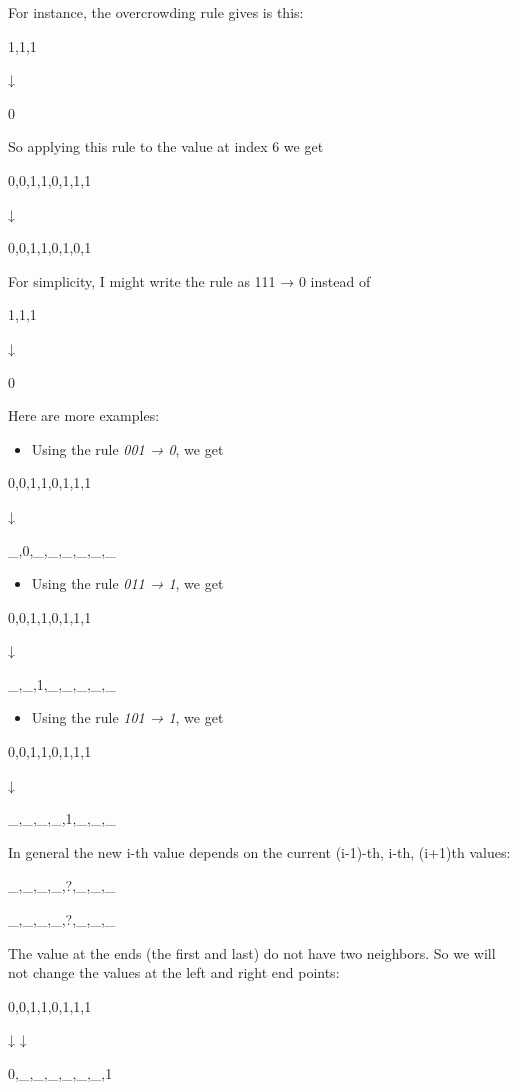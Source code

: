 \documentclass[
]{article}
\providecommand{\tightlist}{%
  \setlength{\itemsep}{0pt}\setlength{\parskip}{0pt}}
\begin{document}
For instance, the overcrowding rule gives is this:

1,1,1

↓

0

So applying this rule to the value at index 6 we get

0,0,1,1,0,1,1,1

↓

0,0,1,1,0,1,0,1

For simplicity, I might write the rule as 111 → 0 instead of

1,1,1

↓

0

Here are more examples:

\begin{itemize}
\tightlist
\item
  Using the rule \emph{001 → 0}, we get
\end{itemize}

0,0,1,1,0,1,1,1

↓

\_,0,\_,\_,\_,\_,\_,\_

\begin{itemize}
\tightlist
\item
  Using the rule \emph{011 → 1}, we get
\end{itemize}

0,0,1,1,0,1,1,1

↓

\_,\_,1,\_,\_,\_,\_,\_

\begin{itemize}
\tightlist
\item
  Using the rule \emph{101 → 1}, we get
\end{itemize}

0,0,1,1,0,1,1,1

↓

\_,\_,\_,\_,1,\_,\_,\_

In general the new i-th value depends on the current (i-1)-th, i-th,
(i+1)th values:

\_,\_,\_,\_,?,\_,\_,\_

\_,\_,\_,\_,?,\_,\_,\_

The value at the ends (the first and last) do not have two neighbors. So
we will not change the values at the left and right end points:

0,0,1,1,0,1,1,1

↓ ↓

0,\_,\_,\_,\_,\_,\_,1
\end{document}
